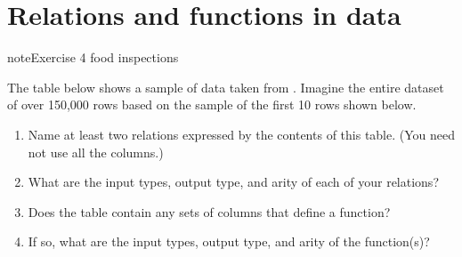\documentclass[letterpaper,10pt,english]{jupyterBook}
\begin{document}
\begin{sphinxVerbatim}[commandchars=\\\{\}]
\PYG{p}{[}\PYG{p}{]}

\PYG{p}{[}\PYG{p}{[}\PYG{p}{]}  \PYG{p}{]}
\end{sphinxVerbatim}


\section{Relations and functions in data}
\label{\detokenize{chapter-2-mathematical-foundations:relations-and-functions-in-data}}
\begin{sphinxadmonition}{note}{Exercise 4 \sphinxhyphen{} food inspections}

\sphinxAtStartPar
The table below shows a sample of data taken from .  Imagine the entire dataset of over 150,000 rows based on the sample of the first 10 rows shown below.
\begin{enumerate}
%
\item {} 
\sphinxAtStartPar
Name at least two relations expressed by the contents of this table.  (You need not use all the columns.)

\item {} 
\sphinxAtStartPar
What are the input types, output type, and arity of each of your relations?

\item {} 
\sphinxAtStartPar
Does the table contain any sets of columns that define a function?

\item {} 
\sphinxAtStartPar
If so, what are the input types, output type, and arity of the function(s)?

\end{enumerate}
\end{sphinxadmonition}
\end{document}
